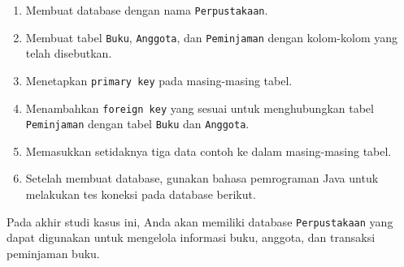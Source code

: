 \begin{enumerate}
	\item Membuat database dengan nama \texttt{Perpustakaan}.
	\item Membuat tabel \texttt{Buku}, \texttt{Anggota}, dan \texttt{Peminjaman} dengan kolom-kolom yang telah disebutkan.
	\item Menetapkan \texttt{primary key} pada masing-masing tabel.
	\item Menambahkan \texttt{foreign key} yang sesuai untuk menghubungkan tabel \texttt{Peminjaman} dengan tabel \texttt{Buku} dan \texttt{Anggota}.
	\item Memasukkan setidaknya tiga data contoh ke dalam masing-masing tabel.
	\item Setelah membuat database, gunakan bahasa pemrograman Java untuk melakukan tes koneksi pada database berikut.
\end{enumerate}

Pada akhir studi kasus ini, Anda akan memiliki database \texttt{Perpustakaan} yang dapat digunakan untuk mengelola informasi buku, anggota, dan transaksi peminjaman buku.